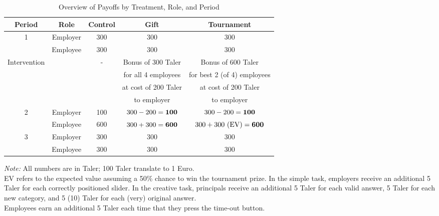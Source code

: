 {\begin{table}[H]\caption{Overview of Payoffs by Treatment, Role, and Period}
\begin{center}%
{\small\renewcommand{\arraystretch}{0.8}
\begin{tabular}{|c|c|c|c|c|} \hline\hline
	\bf Period 	& \bf Role 	& \bf Control 	& \bf Gift 	& \bf Tournament \\
	\hline
	\multirow{2}{*}{1} 	& Employer & 300 & 300 & 300 \\
						& Employee & 300 & 300 & 300 \\
	\hline
	\multirow{4}{*}{Intervention} 	& & \multirow{4}{*}{-}	& Bonus of 300 Taler & Bonus of 600 Taler \\
									& &						& for all 4 employees & for best 2 (of 4) employees \\
									& & 					& at cost of 200 Taler & at cost of 200 Taler \\
									& & 					& to employer			& to employer \\
	\hline
	\multirow{2}{*}{2} 	& Employer 	& 100 & $300 - 200 = \bf{100}$ 	& $300-200 = \bf{100}$ \\
						& Employee	& 600 & $300 + 300 = \bf{600}$ 	& $300 + 300 \text{ (EV)} = \bf{600}$ \\
	\hline
	\multirow{2}{*}{3}	& Employer	& 300 & 300 & 300 \\
						& Employee 	& 300 & 300 & 300 \\
	\hline \hline
\end{tabular}}
\label{tab:payoff_overview}
\begin{minipage}{0.98\linewidth}
	\footnotesize
	\vspace{5mm}
	{\it Note:} All numbers are in Taler; 100 Taler translate to 1 Euro. \\
	EV refers to the expected value assuming a 50\% chance to win the tournament prize. 
	In the simple task, employers receive an additional 5 Taler for each correctly positioned slider. In the creative task, principals receive an additional 5 Taler for each valid answer, 5 Taler for each new category, and 5 (10) Taler for each (very) original answer. \\
	Employees earn an additional 5 Taler each time that they press the time-out button. 
\end{minipage}
\end{center}
\end{table}}